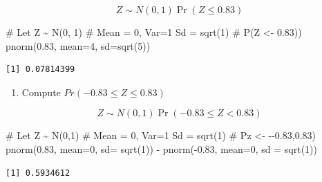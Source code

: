 \documentclass[
]{article}
\newenvironment{Shaded}{\begin{snugshade}}{\end{snugshade}}
\newcommand{\AttributeTok}[1]{\textcolor[rgb]{0.40,0.45,0.13}{#1}}
\newcommand{\CommentTok}[1]{\textcolor[rgb]{0.37,0.37,0.37}{#1}}
\newcommand{\DecValTok}[1]{\textcolor[rgb]{0.68,0.00,0.00}{#1}}
\newcommand{\FloatTok}[1]{\textcolor[rgb]{0.68,0.00,0.00}{#1}}
\newcommand{\FunctionTok}[1]{\textcolor[rgb]{0.28,0.35,0.67}{#1}}
\newcommand{\NormalTok}[1]{\textcolor[rgb]{0.00,0.23,0.31}{#1}}
\newcommand{\SpecialCharTok}[1]{\textcolor[rgb]{0.37,0.37,0.37}{#1}}
\providecommand{\tightlist}{%
  \setlength{\itemsep}{0pt}\setlength{\parskip}{0pt}}
\begin{document}
\begin{tcolorbox}[enhanced jigsaw, arc=.35mm, bottomrule=.15mm, breakable, colback=white, colframe=quarto-callout-tip-color-frame, left=2mm, leftrule=.75mm, opacityback=0, rightrule=.15mm, toprule=.15mm]

\[Z\sim N(0,1)\Pr(Z\leq 0.83)\]

\begin{Shaded}
\begin{Highlighting}[]
\CommentTok{\# Let Z \textasciitilde{} N(0, 1)}
\CommentTok{\# Mean = 0, Var=1 Sd = sqrt(1)}
\CommentTok{\# P(Z \textless{}{-} 0.83))}
\FunctionTok{pnorm}\NormalTok{(}\FloatTok{0.83}\NormalTok{, }\AttributeTok{mean=}\DecValTok{4}\NormalTok{, }\AttributeTok{sd=}\FunctionTok{sqrt}\NormalTok{(}\DecValTok{5}\NormalTok{))}
\end{Highlighting}
\end{Shaded}

\begin{verbatim}
[1] 0.07814399
\end{verbatim}

\end{tcolorbox}

\begin{enumerate}
\def\labelenumi{(\alph{enumi})}
\setcounter{enumi}{1}
\tightlist
\item
  Compute \(Pr(-0.83 \leq Z\leq 0.83)\)
\end{enumerate}

\begin{tcolorbox}[enhanced jigsaw, arc=.35mm, bottomrule=.15mm, breakable, colback=white, colframe=quarto-callout-tip-color-frame, left=2mm, leftrule=.75mm, opacityback=0, rightrule=.15mm, toprule=.15mm]

\[Z\sim N(0,1)\Pr(-0.83\leq Z< 0.83)\]

\begin{Shaded}
\begin{Highlighting}[]
\CommentTok{\# Let Z \textasciitilde{} N(0,1)}
\CommentTok{\# Mean = 0, Var=1 Sd = sqrt(1)}
\CommentTok{\# Pz \textless{}{-} {-}{-}0.83,0.83)}
\FunctionTok{pnorm}\NormalTok{(}\FloatTok{0.83}\NormalTok{, }\AttributeTok{mean=}\DecValTok{0}\NormalTok{, }\AttributeTok{sd=} \FunctionTok{sqrt}\NormalTok{(}\DecValTok{1}\NormalTok{)) }\SpecialCharTok{{-}} 
        \FunctionTok{pnorm}\NormalTok{(}\SpecialCharTok{{-}}\FloatTok{0.83}\NormalTok{, }\AttributeTok{mean=}\DecValTok{0}\NormalTok{, }\AttributeTok{sd =} \FunctionTok{sqrt}\NormalTok{(}\DecValTok{1}\NormalTok{))}
\end{Highlighting}
\end{Shaded}

\begin{verbatim}
[1] 0.5934612
\end{verbatim}

\end{tcolorbox}
\end{document}
